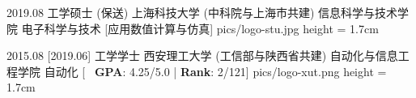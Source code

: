 \begin{educations}
    \education
    {2019.08}
    {工学硕士 (保送)}
    {上海科技大学 (中科院与上海市共建)}
    {信息科学与技术学院}
    {电子科学与技术}
    [\textbullet 应用数值计算与仿真]
    {pics/logo-stu.jpg} {height = 1.7cm}

    \separator{0.5ex}
    \education
    {2015.08}
    [2019.06]
    {工学学士}
    {西安理工大学 (工信部与陕西省共建)}
    {自动化与信息工程学院}
    {自动化}
    [\textbullet ~ \textbf{GPA}: 4.25/5.0 | \textbf{Rank}: 2/121]
    {pics/logo-xut.png} {height = 1.7cm}

\end{educations}